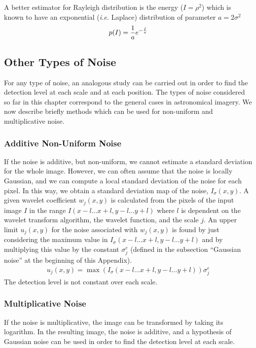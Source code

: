 A better estimator for Rayleigh distribution is the  energy ($I=\rho^2$)
which is known to have an exponential ({\it i.e.} Laplace) 
distribution of parameter $a=2\sigma^2$
\begin{eqnarray*}
p(I)={1\over a}e^{-\frac{I}{a}}
\end{eqnarray*}

\subsection*{Other Types of Noise}
For any type of noise, an analogous study can be carried out in order to find
the detection level at each scale and at each position. The 
types of noise considered so far in this chapter correspond to the general 
cases in astronomical imagery. 
We now describe briefly methods which can be used for non-uniform and
multiplicative noise. 

\subsubsection*{Additive Non-Uniform Noise}
\label{noise_addi_uni}
If the noise is additive, but non-uniform, we cannot estimate a standard
deviation for the whole image. However, we can often assume that the noise
is locally Gaussian, and we can compute a local standard deviation of the 
noise for each pixel. In this way, we obtain a standard deviation 
map of the noise, $I_{\sigma}(x,y)$. 
A given wavelet coefficient $w_j(x,y)$ is calculated
from the pixels of the input image $I$ in the range $I(x-l \dots x+l, y-l 
\dots y+l)$
where $l$ is dependent on the wavelet transform algorithm, the wavelet 
function,
and the scale $j$. An upper limit $u_j(x,y)$ for the noise associated with
$w_j(x,y)$ is 
found by just considering the maximum value in 
$I_{\sigma}(x-l \dots x+l,y-l \dots y+l)$ and
 by multiplying this value by the constant $\sigma_j^e$ (defined in the 
subsection ``Gaussian noise'' at the beginning of this Appendix).
\begin{eqnarray}
u_j(x,y) = \max(I_{\sigma}(x-l \dots x+l, y-l \dots y+l)) \sigma_j^e
\end{eqnarray}
The detection level is not constant over each scale. 
 
\subsubsection*{Multiplicative Noise}
If the noise is multiplicative, the image can be transformed by taking
its logarithm. In the resulting image, the noise is additive, and 
a hypothesis of Gaussian noise can be used in order to find the 
detection level at each scale.

